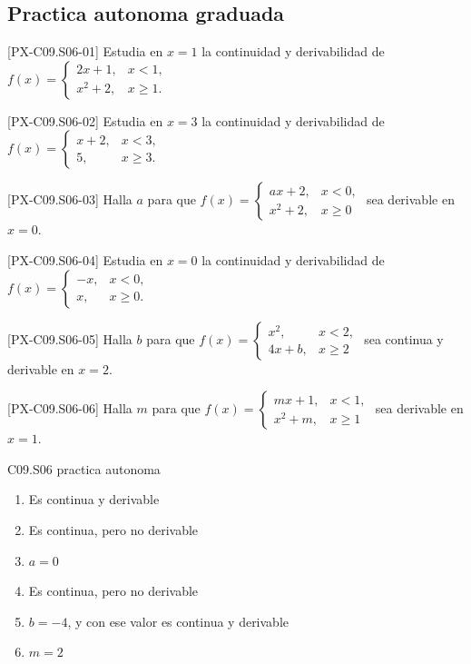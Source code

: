 \subsection*{Practica autonoma graduada}
\begin{exercise}{[PX-C09.S06-01] Estudia en \(x=1\) la continuidad y derivabilidad de
\(
f(x)=
\begin{cases}
2x+1,& x<1,\\
x^2+2,& x\geq 1.
\end{cases}
\)}
\end{exercise}
\begin{exercise}{[PX-C09.S06-02] Estudia en \(x=3\) la continuidad y derivabilidad de
\(
f(x)=
\begin{cases}
x+2,& x<3,\\
5,& x\geq 3.
\end{cases}
\)}
\end{exercise}
\begin{exercise}{[PX-C09.S06-03] Halla \(a\) para que
\(
f(x)=
\begin{cases}
ax+2,& x<0,\\
x^2+2,& x\geq 0
\end{cases}
\)
sea derivable en \(x=0\).}
\end{exercise}
\begin{exercise}{[PX-C09.S06-04] Estudia en \(x=0\) la continuidad y derivabilidad de
\(
f(x)=
\begin{cases}
-x,& x<0,\\
x,& x\geq 0.
\end{cases}
\)}
\end{exercise}
\begin{exercise}{[PX-C09.S06-05] Halla \(b\) para que
\(
f(x)=
\begin{cases}
x^2,& x<2,\\
4x+b,& x\geq 2
\end{cases}
\)
sea continua y derivable en \(x=2\).}
\end{exercise}
\begin{exercise}{[PX-C09.S06-06] Halla \(m\) para que
\(
f(x)=
\begin{cases}
mx+1,& x<1,\\
x^2+m,& x\geq 1
\end{cases}
\)
sea derivable en \(x=1\).}
\end{exercise}

\begin{shortanswer}{C09.S06 practica autonoma}
\begin{enumerate}[label=\textbf{PX-C09.S06-\arabic*:}, leftmargin=*]
  \item Es continua y derivable
  \item Es continua, pero no derivable
  \item \(a=0\)
  \item Es continua, pero no derivable
  \item \(b=-4\), y con ese valor es continua y derivable
  \item \(m=2\)
\end{enumerate}
\end{shortanswer}


